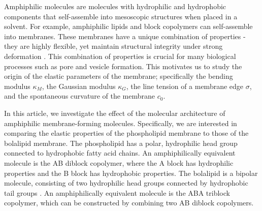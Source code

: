 \documentclass[twocolumn,aps,floatfix,nobibnotes]{revtex4-1}
\begin{document}
Amphiphilic molecules are molecules with hydrophilic and hydrophobic components that self-assemble into mesoscopic structures when placed in a solvent. For example, amphiphilic lipids and block copolymers can self-assemble into membranes. These membranes have a unique combination of properties - they are highly flexible, yet maintain structural integrity under strong deformation \cite{lipowsky1998vesicles}. This combination of properties is crucial for many biological processes such as pore and vesicle formation. This motivates us to study the origin of the elastic parameters of the membrane; specifically the bending modulus $\kappa_M$, the Gaussian modulus $\kappa_G$, the line tension of a membrane edge $\sigma$, and the spontaneous curvature of the membrane $c_0$.

In this article, we investigate the effect of the molecular architecture of amphiphilic membrane-forming molecules. Specifically, we are interested in comparing the elastic properties of the phospholipid membrane to those of the bolalipid membrane. The phospholipid has a polar, hydrophilic head group connected to hydrophobic fatty acid chains. An amphiphilically equivalent molecule is the AB diblock copolymer, where the A block has hydrophilic properties and the B block has hydrophobic properties. The bolalipid is a bipolar molecule, consisting of two hydrophilic head groups connected by hydrophobic tail groups \cite{koga2007biosynthesis,gliozzi2002structure}. An amphiphilically equivalent molecule is the ABA triblock copolymer, which can be constructed by combining two AB diblock copolymers.
\end{document}
